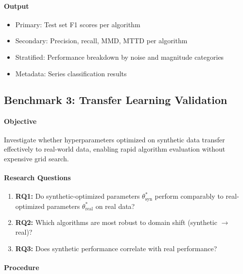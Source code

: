 \paragraph{Output}

\begin{itemize}
    \item Primary: Test set F1 scores per algorithm
    \item Secondary: Precision, recall, MMD, MTTD per algorithm
    \item Stratified: Performance breakdown by noise and magnitude categories
    \item Metadata: Series classification results
\end{itemize}

\subsection{Benchmark 3: Transfer Learning Validation}
\label{sec:benchmark3}

\paragraph{Objective}

Investigate whether hyperparameters optimized on synthetic data transfer effectively to real-world data, enabling rapid algorithm evaluation without expensive grid search.

\paragraph{Research Questions}

\begin{enumerate}
    \item \textbf{RQ1:} Do synthetic-optimized parameters $\theta^*_{\text{syn}}$ perform comparably to real-optimized parameters $\theta^*_{\text{real}}$ on real data?
    \item \textbf{RQ2:} Which algorithms are most robust to domain shift (synthetic $\rightarrow$ real)?
    \item \textbf{RQ3:} Does synthetic performance correlate with real performance?
\end{enumerate}

\paragraph{Procedure}

